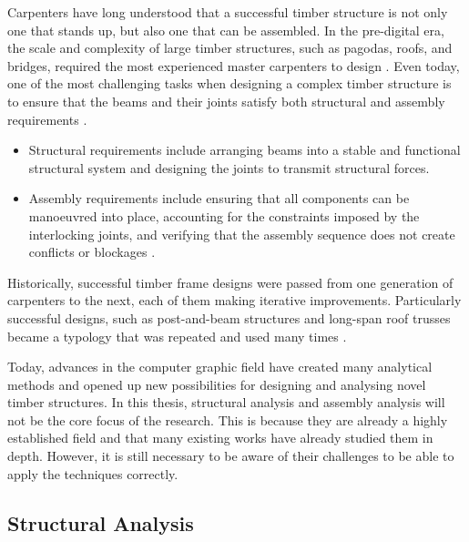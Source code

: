 Carpenters have long understood that a successful timber structure is not only one that stands up, but also one that can be assembled. In the pre-digital era, the scale and complexity of large timber structures, such as pagodas, roofs, and bridges, required the most experienced master carpenters to design \parencite{haymanTimberframedBuildings2021, hewettEnglishHistoricCarpentry2022, mullerHistoryDevelopmentStages2022, vandenabeeleJoiningTechniquesNineteenth2018}. Even today, one of the most challenging tasks when designing a complex timber structure is to ensure that the beams and their joints satisfy both structural and assembly requirements \parencite{chiltonTimberGridshellsArchitecture2016}.

\begin{itemize}
	\item Structural requirements include arranging beams into a stable and functional structural system and designing the joints to transmit structural forces. 

	\item Assembly requirements include ensuring that all components can be manoeuvred into place, accounting for the constraints imposed by the interlocking joints, and verifying that the assembly sequence does not create conflicts or blockages \parencite{wangStateArtComputational2021}. 

\end{itemize}
Historically, successful timber frame designs were passed from one generation of carpenters to the next, each of them making iterative improvements. Particularly successful designs, such as post-and-beam structures and long-span roof trusses became a typology that was repeated and used many times \parencite{sobonTimberFrameConstruction1984, jacksobonHistoricAmericanTimber2014}.

Today, advances in the computer graphic field have created many analytical methods and opened up new possibilities for designing and analysing novel timber structures. In this thesis, structural analysis and assembly analysis will not be the core focus of the research. This is because they are already a highly established field and that many existing works have already studied them in depth. However, it is still necessary to be aware of their challenges to be able to apply the techniques correctly.

\subsection{Structural Analysis}
\label{subsection:challenges-structural-analysis}

